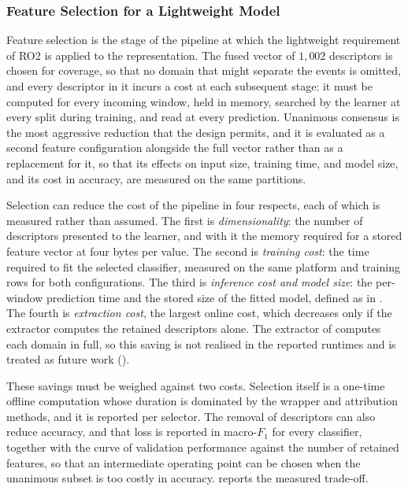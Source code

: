 \subsubsection{Feature Selection for a Lightweight Model}
\label{sec:chap3LightweightSelection}
Feature selection is the stage of the pipeline at which the lightweight requirement of RO2 is applied to the representation. The fused vector of $1{,}002$ descriptors is chosen for coverage, so that no domain that might separate the events is omitted, and every descriptor in it incurs a cost at each subsequent stage: it must be computed for every incoming window, held in memory, searched by the learner at every split during training, and read at every prediction. Unanimous consensus is the most aggressive reduction that the design permits, and it is evaluated as a second feature configuration alongside the full vector rather than as a replacement for it, so that its effects on input size, training time, and model size, and its cost in accuracy, are measured on the same partitions.

Selection can reduce the cost of the pipeline in four respects, each of which is measured rather than assumed. The first is \emph{dimensionality}: the number of descriptors presented to the learner, and with it the memory required for a stored feature vector at four bytes per value. The second is \emph{training cost}: the time required to fit the selected classifier, measured on the same platform and training rows for both configurations. The third is \emph{inference cost and model size}: the per-window prediction time and the stored size of the fitted model, defined as in . The fourth is \emph{extraction cost}, the largest online cost, which decreases only if the extractor computes the retained descriptors alone. The extractor of  computes each domain in full, so this saving is not realised in the reported runtimes and is treated as future work ().

These savings must be weighed against two costs. Selection itself is a one-time offline computation whose duration is dominated by the wrapper and attribution methods, and it is reported per selector. The removal of descriptors can also reduce accuracy, and that loss is reported in macro-$F_1$ for every classifier, together with the curve of validation performance against the number of retained features, so that an intermediate operating point can be chosen when the unanimous subset is too costly in accuracy.  reports the measured trade-off.

